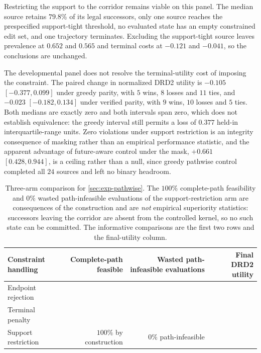 Restricting the support to the corridor remains viable on this panel. The median source retains $79.8\%$ of its legal successors, only one source reaches the prespecified support-tight threshold, no evaluated state has an empty constrained edit set, and one trajectory terminates. Excluding the support-tight source leaves prevalence at $0.652$ and $0.565$ and terminal costs at $-0.121$ and $-0.041$, so the conclusions are unchanged.

The developmental panel does not resolve the terminal-utility cost of imposing the constraint. The paired change in normalized DRD2 utility is $-0.105$ $[-0.377,0.099]$ under greedy parity, with $5$ wins, $8$ losses and $11$ ties, and $-0.023$ $[-0.182,0.134]$ under verified parity, with $9$ wins, $10$ losses and $5$ ties. Both medians are exactly zero and both intervals span zero, which does not establish equivalence: the greedy interval still permits a loss of $0.377$ held-in interquartile-range units. Zero violations under support restriction is an integrity consequence of masking rather than an empirical performance statistic, and the apparent advantage of future-aware control under the mask, $+0.661$ $[0.428,0.944]$, is a ceiling rather than a null, since greedy pathwise control completed all $24$ sources and left no binary headroom.

\begin{table}[h]
\centering
{\small
\begin{tabular}{lrrr}
\toprule
Constraint handling & Complete-path feasible & Wasted path-infeasible evaluations & Final DRD2 utility \\
\midrule
Endpoint rejection & \XXX{} & \XXX{} & \XXX{} \\
Terminal penalty & \XXX{} & \XXX{} & \XXX{} \\
Support restriction & $100\%$ by construction & $0\%$ path-infeasible & \XXX{} \\
\bottomrule
\end{tabular}}
\caption{\small Three-arm comparison for \cref{sec:exp-pathwise}. The $100\%$ complete-path feasibility and $0\%$ wasted path-infeasible evaluations of the support-restriction arm are consequences of the construction and are \emph{not} empirical superiority statistics: successors leaving the corridor are absent from the controlled kernel, so no such state can be committed. The informative comparisons are the first two rows and the final-utility column.}
\label{tab:pathwise}
\end{table}

